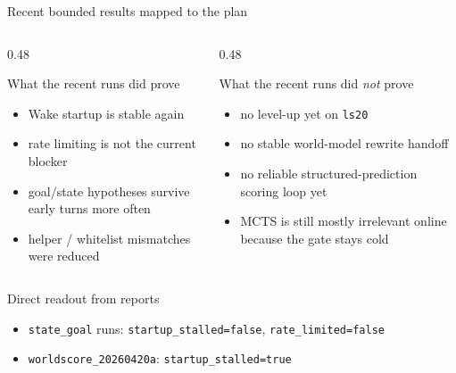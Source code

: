 \documentclass[aspectratio=169]{beamer}
\begin{document}
\begin{frame}{Recent bounded results mapped to the plan}
\small
\begin{columns}[T,totalwidth=\textwidth]
\begin{column}{0.48\textwidth}
\begin{block}{What the recent runs did prove}
\begin{itemize}
\item Wake startup is stable again
\item rate limiting is not the current blocker
\item goal/state hypotheses survive early turns more often
\item helper / whitelist mismatches were reduced
\end{itemize}
\end{block}
\end{column}
\begin{column}{0.48\textwidth}
\begin{block}{What the recent runs did \emph{not} prove}
\begin{itemize}
\item no level-up yet on \texttt{ls20}
\item no stable world-model rewrite handoff
\item no reliable structured-prediction scoring loop yet
\item MCTS is still mostly irrelevant online because the gate stays cold
\end{itemize}
\end{block}
\end{column}
\end{columns}

\vspace{0.4em}
\begin{block}{Direct readout from reports}
\begin{itemize}
\item \texttt{state\_goal} runs: \texttt{startup\_stalled=false}, \texttt{rate\_limited=false}
\item \texttt{worldscore\_20260420a}: \texttt{startup\_stalled=true}
\end{itemize}
\end{block}
\end{frame}
\end{document}
